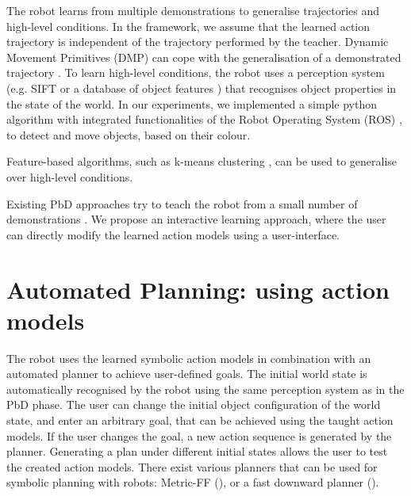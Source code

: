 The robot learns from multiple demonstrations to generalise trajectories and high-level conditions.
In the framework, we assume that the learned action trajectory is independent of the trajectory performed by the teacher.
Dynamic Movement Primitives (DMP) can cope with the generalisation of a demonstrated trajectory \cite{pastor2009learning}.
To learn high-level conditions, the robot uses a perception system (e.g. SIFT \cite{ahmadzadeh2015learning} or a database of object features \cite{mason2011robot}) that recognises object properties in the state of the world. 
In our experiments, we implemented a simple python algorithm with integrated functionalities of the Robot Operating System (ROS) \cite{quigley2009ros}, to detect and move objects, based on their colour.

Feature-based algorithms, such as k-means clustering \cite{mollard2015robot}, can be used to generalise over high-level conditions.


Existing PbD approaches try to teach the robot from a small number of demonstrations \cite{orendt2016robot,abdo2013learning}.
We propose an interactive learning approach, where the user can directly modify the learned action models using a user-interface.


\section{Automated Planning: using action models}\label{sec:AP}
The robot uses the learned symbolic action models in combination with an automated planner to achieve user-defined goals. 
The initial world state is automatically recognised by the robot using the same perception system as in the PbD phase. 
The user can change the initial object configuration of the world state, and enter an arbitrary goal, that can be achieved using the taught action models.
If the user changes the goal, a new action sequence is generated by the planner.
Generating a plan under different initial states allows the user to test the created action models.
There exist various planners that can be used for symbolic planning with robots: Metric-FF (\cite{cubek2015high}), or a fast downward planner (\cite{abdo2013learning}). 


